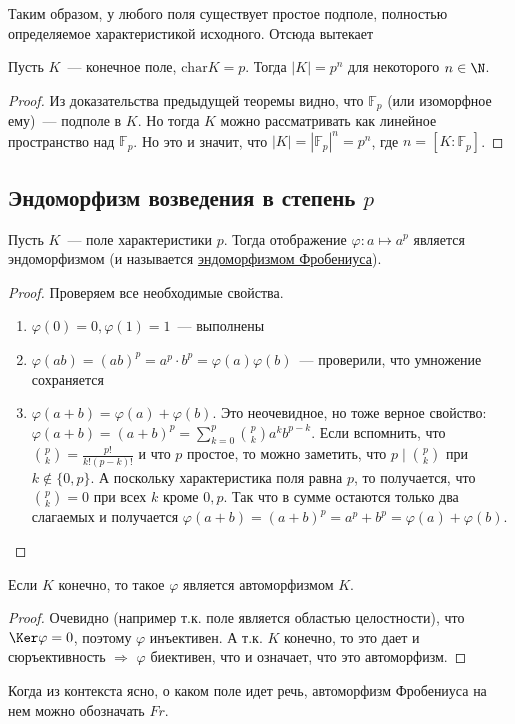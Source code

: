Таким образом, у любого поля существует простое подполе, полностью определяемое характеристикой исходного.
Отсюда вытекает

\follow Пусть $K$~--- конечное поле, $\text{char} K = p$. Тогда $|K|=p^n$ для некоторого $n\in\N$.
\begin{proof}
    Из доказательства предыдущей теоремы видно, что $\mathbb{F}_p$ (или изоморфное ему)~--- подполе в $K$.
    Но тогда $K$ можно рассматривать как линейное пространство над $\mathbb{F}_p$.
    Но это и значит, что $|K|=|\mathbb{F}_p|^n=p^n$, где $n = [K:\mathbb{F}_p]$.
\end{proof}

\subsection{Эндоморфизм возведения в степень $p$}
\begin{lemma}
    Пусть $K$~--- поле характеристики $p$.
    Тогда отображение $\varphi: a \mapsto a^p$ является эндоморфизмом (и называется \underline{эндоморфизмом Фробениуса}).
\end{lemma}
\begin{proof}
    Проверяем все необходимые свойства.
    \begin{enumerate}
        \item $\varphi(0)=0, \varphi(1)=1$~--- выполнены
        \item $\varphi(ab) = (ab)^p = a^p \cdot b^p = \varphi(a)\varphi(b)$~--- проверили, что умножение сохраняется
        \item $\varphi(a+b)=\varphi(a)+\varphi(b)$.
        Это неочевидное, но тоже верное свойство: $\varphi(a+b)=(a+b)^p = \sum_{k=0}^p \binom{p}{k} a^k b^{p-k}$.
        Если вспомнить, что $\binom{p}{k} = \frac{p!}{k!(p-k)!}$ и что $p$ простое, то можно заметить, что $p \mid \binom{p}{k}$ при $k\notin \{0, p\}$.
        А поскольку характеристика поля равна $p$, то получается, что $\binom{p}{k}=0$ при всех $k$ кроме $0, p$.
        Так что в сумме остаются только два слагаемых и получается $\varphi(a+b)=(a+b)^p = a^p + b^p = \varphi(a) + \varphi(b)$.
    \end{enumerate}
\end{proof}
\follow Если $K$ конечно, то такое $\varphi$ является автоморфизмом $K$.
\begin{proof}
    Очевидно (например т.к. поле является областью целостности), что $\Ker \varphi = 0$, поэтому $\varphi$ инъективен.
    А т.к. $K$ конечно, то это дает и сюръективность $\Rightarrow$ $\varphi$ биективен, что и означает, что это автоморфизм.
\end{proof}
\notice Когда из контекста ясно, о каком поле идет речь, автоморфизм Фробениуса на нем можно обозначать $Fr$.


